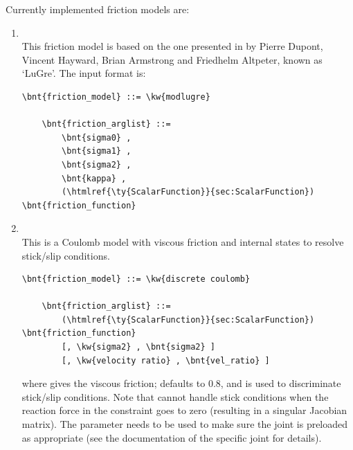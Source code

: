 Currently implemented friction models are:
\begin{enumerate}
\item {}\\
This friction model is based on the one presented in \cite{LUGRE-2002}
by Pierre Dupont, Vincent Hayward, Brian Armstrong and Friedhelm Altpeter,
known as `LuGre'.
The input format is:
\begin{Verbatim}[commandchars=\\\{\}]
    \bnt{friction_model} ::= \kw{modlugre}

    \bnt{friction_arglist} ::=
        \bnt{sigma0} ,
        \bnt{sigma1} ,
        \bnt{sigma2} ,
        \bnt{kappa} ,
        (\htmlref{\ty{ScalarFunction}}{sec:ScalarFunction}) \bnt{friction_function}
\end{Verbatim}

    \item {}\\
    This is a Coulomb model with viscous friction and
    internal states to resolve stick/slip conditions.
\begin{Verbatim}[commandchars=\\\{\}]
    \bnt{friction_model} ::= \kw{discrete coulomb}

    \bnt{friction_arglist} ::=
        (\htmlref{\ty{ScalarFunction}}{sec:ScalarFunction}) \bnt{friction_function}
        [, \kw{sigma2} , \bnt{sigma2} ]
        [, \kw{velocity ratio} , \bnt{vel_ratio} ]
\end{Verbatim}
    where  gives the viscous friction;
     defaults to 0.8, and is used
    to discriminate stick/slip conditions.
    Note that 
    cannot handle stick conditions when the reaction force
    in the constraint goes to zero (resulting in a singular Jacobian matrix).
    The  parameter needs to be used to make sure
    the joint is preloaded as appropriate
    (see the documentation of the specific joint for details).
\end{enumerate}

